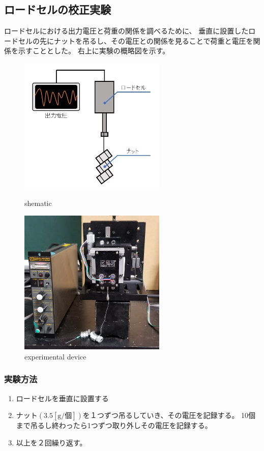 \documentclass[twocolumn,a4j]{jsarticle}
\begin{document}
\subsection{ロードセルの校正実験}
ロードセルにおける出力電圧と荷重の関係を調べるために、
垂直に設置したロードセルの先にナットを吊るし、その電圧との関係を見ることで荷重と電圧を関係を示すこととした。
右上に実験の概略図を示す。
\begin{figure}[htbp]
    \begin{center}
        \includegraphics[width=70mm]{images/schematic.jpg}
        \caption{shematic}
        \includegraphics[width=70mm]{images/loadcell.jpg}
        \caption{experimental device}
    \end{center}
\end{figure}
\subsubsection{実験方法}
\begin{enumerate}[(1)]
    \item ロードセルを垂直に設置する
    \item ナット$\left(3.5 \mathrm{\left[g/個\right]}\right)$を１つずつ吊るしていき、その電圧を記録する。
          10個まで吊るし終わったら1つずつ取り外しその電圧を記録する。
    \item 以上を２回繰り返す。
\end{enumerate}
\end{document}
